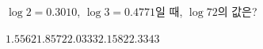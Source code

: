 $\log 2=0.3010$, $\log 3=0.4771$일 때, $\log 72$의 값은?
\begin{choices32}{$1.5562$}{$1.8572$}{$2.0333$}{$2.1582$}{$2.3343$}\end{choices32}
